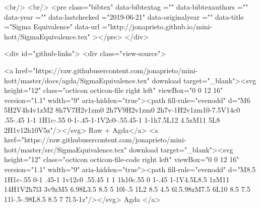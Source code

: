   <br/>
  <br/>
  <pre class="bibtex"
       data-bibtextag =""
       data-bibtexauthors =""
       data-year =""
       data-lastchecked ="2019-06-21"
       data-originalyear =""
       data-title ="Sigma Equivalence"
       data-url ="http://jonaprieto.github.io/mini-hott/SigmaEquivalence.tex"
  ></pre>
  </div>
  

  <div id="github-links">
    <div class="view-source">
      
        <a href="https://raw.githubusercontent.com/jonaprieto/mini-hott/master/docs/agda/SigmaEquivalence.tex" download target="_blank"><svg height="12" class="octicon octicon-file right left" viewBox="0 0 12 16" version="1.1" width="9" aria-hidden="true"><path fill-rule="evenodd" d="M6 5H2V4h4v1zM2 8h7V7H2v1zm0 2h7V9H2v1zm0 2h7v-1H2v1zm10-7.5V14c0 .55-.45 1-1 1H1c-.55 0-1-.45-1-1V2c0-.55.45-1 1-1h7.5L12 4.5zM11 5L8 2H1v12h10V5z"/></svg> Raw + Agda</a>
        <a href="https://raw.githubusercontent.com/jonaprieto/mini-hott/master/src/SigmaEquivalence.tex" download target="_blank"><svg height="12" class="octicon octicon-file-code right left" viewBox="0 0 12 16" version="1.1" width="9" aria-hidden="true"><path fill-rule="evenodd" d="M8.5 1H1c-.55 0-1 .45-1 1v12c0 .55.45 1 1 1h10c.55 0 1-.45 1-1V4.5L8.5 1zM11 14H1V2h7l3 3v9zM5 6.98L3.5 8.5 5 10l-.5 1L2 8.5 4.5 6l.5.98zM7.5 6L10 8.5 7.5 11l-.5-.98L8.5 8.5 7 7l.5-1z"/></svg> Agda </a>
      
